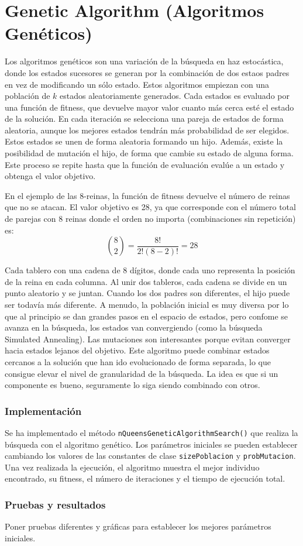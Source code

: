\documentclass[..main.tex]{subfiles}
\begin{document}
\section{Genetic Algorithm (Algoritmos Genéticos)}
Los algoritmos genéticos son una variación de la búsqueda en haz estocástica, donde los estados sucesores se generan por la combinación de dos estaos padres en vez de modificando un sólo estado. Estos algoritmos empiezan con una población de $k$ estados aleatoriamente generados. Cada estados es evaluado por una función de fitness, que devuelve mayor valor cuanto más cerca esté el estado de la solución. En cada iteración se selecciona una pareja de estados de forma aleatoria, aunque los mejores estados tendrán más probabilidad de ser elegidos. Estos estados se unen de forma aleatoria formando un hijo. Además, existe la posibilidad de mutación el hijo, de forma que cambie su estado de alguna forma. Este proceso se repite hasta que la función de evaluación evalúe a un estado y obtenga el valor objetivo.

En el ejemplo de las 8-reinas, la función de fitness devuelve el número de reinas que no se atacan. El valor objetivo es 28, ya que corresponde con el número total de parejas con 8 reinas donde el orden no importa (combinaciones sin repetición) es:
 $${8\choose 2} = \frac{8!}{2!(8-2)!}=28$$
 
 Cada tablero con una cadena de 8 dígitos, donde cada uno representa la posición de la reina en cada columna. Al unir dos tableros, cada cadena se divide en un punto aleatorio y se juntan. Cuando los dos padres son diferentes, el hijo puede ser todavía más diferente. A menudo, la población inicial es muy diversa por lo que al principio se dan grandes pasos en el espacio de estados, pero confome se avanza en la búsqueda, los estados van convergiendo (como la búsqueda Simulated Annealing). Las mutaciones son interesantes porque evitan converger hacia estados lejanos del objetivo. Este algoritmo puede combinar estados cercanos a la solución que han ido evolucionado de forma separada, lo que consigue elevar el nivel de granularidad de la búsqueda. La idea es que si un componente es bueno, seguramente lo siga siendo combinado con otros.

\subsubsection{Implementación}
Se ha implementado el método \texttt{nQueensGeneticAlgorithmSearch()} que realiza la búsqueda con el algoritmo genético. Los parámetros iniciales se pueden establecer cambiando los valores de las constantes de clase \texttt{sizePoblacion} y \texttt{probMutacion}. Una vez realizada la ejecución, el algoritmo muestra el mejor individuo encontrado, su fitness, el número de iteraciones y el tiempo de ejecución total.

\subsubsection{Pruebas y resultados}
Poner pruebas diferentes y gráficas para establecer los mejores parámetros iniciales. %
\end{document}
